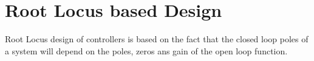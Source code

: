 \section{Root Locus based Design}\label{rLocus}

Root Locus design of controllers is based on the fact that the closed loop poles of a system will depend on the poles, zeros ans gain of the open loop function.

